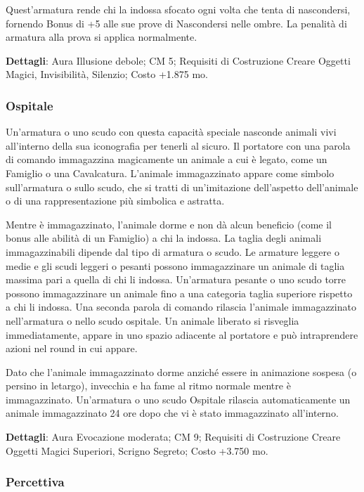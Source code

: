 \begin{multicols}{2}
Quest'armatura rende chi la indossa sfocato ogni volta che tenta di nascondersi, fornendo Bonus di +5 alle sue prove di Nascondersi nelle ombre. La penalità di armatura alla prova si applica normalmente.

\textbf{Dettagli}: Aura Illusione debole; CM 5; Requisiti di Costruzione Creare Oggetti Magici, Invisibilità, Silenzio; Costo +1.875 mo.

\subsubsection{Ospitale}

Un'armatura o uno scudo con questa capacità speciale nasconde animali vivi all'interno della sua iconografia per tenerli al sicuro. Il portatore con una parola di comando immagazzina magicamente un animale a cui è legato, come un Famiglio o una Cavalcatura. L'animale immagazzinato appare come simbolo sull'armatura o sullo scudo, che si tratti di un'imitazione dell'aspetto dell'animale o di una rappresentazione più simbolica e astratta.

Mentre è immagazzinato, l'animale dorme e non dà alcun beneficio (come il bonus alle abilità di un Famiglio) a chi la indossa. La taglia degli animali immagazzinabili dipende dal tipo di armatura o scudo. Le armature leggere o medie e gli scudi leggeri o pesanti possono immagazzinare un animale di taglia massima pari a quella di chi li indossa. Un'armatura pesante o uno scudo torre possono immagazzinare un animale fino a una categoria taglia superiore rispetto a chi li indossa. Una seconda parola di comando rilascia l'animale immagazzinato nell'armatura o nello scudo ospitale. Un animale liberato si risveglia immediatamente, appare in uno spazio adiacente al portatore e può intraprendere azioni nel round in cui appare.

Dato che l'animale immagazzinato dorme anziché essere in animazione sospesa (o persino in letargo), invecchia e ha fame al ritmo normale mentre è immagazzinato. Un'armatura o uno scudo Ospitale rilascia automaticamente un animale immagazzinato 24 ore dopo che vi è stato immagazzinato all'interno.

\textbf{Dettagli}: Aura Evocazione moderata; CM 9; Requisiti di Costruzione Creare Oggetti Magici Superiori, Scrigno Segreto; Costo +3.750 mo.


\subsubsection{Percettiva}


\end{multicols}
